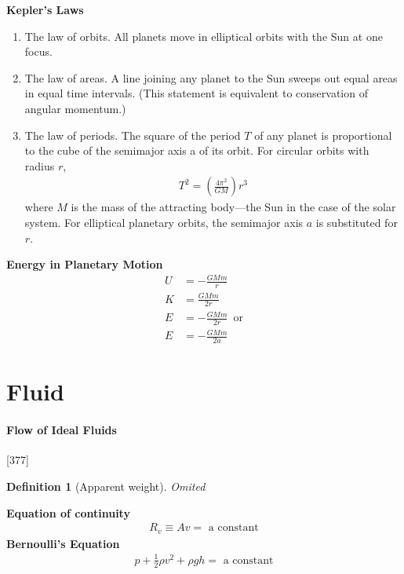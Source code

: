 \documentclass{article}
\numberwithin{equation}{subsection} %
\newtheorem{defi}{Definition}[section]
\theoremstyle{definition}
\begin{document}
\textbf{Kepler's Laws}
\begin{enumerate}
    \item The law of orbits. All planets move in elliptical orbits
        with the Sun at one focus.
    \item The law of areas. A line joining any planet to the Sun
        sweeps out equal areas in equal time intervals. (This
        statement is equivalent to conservation of angular momentum.)
    \item The law of periods. The square of the period $T$ of any
        planet is proportional to the cube of the semimajor axis a of
        its orbit. For circular orbits with radius $r$,
    \begin{align}
        T^2 = \left(\frac{4\pi^2}{GM}\right) r^3
    \end{align}
        where $M$ is the mass of the attracting body—the Sun in the
        case of the solar system. For elliptical planetary orbits, the
        semimajor axis $a$ is substituted for $r$.
\end{enumerate}

\textbf{Energy in Planetary Motion}
\begin{align}
    U &= -\frac{GMm}{r} \\
    K &= \frac{GMm}{2r} \\
    E &= -\frac{GMm}{2r} \,\text{ or} \\
    E &= -\frac{GMm}{2a} 
\end{align}

\section{Fluid}
\label{sec:Fluid}

\paragraph{Flow of Ideal Fluids}[377]
\begin{defi}[Apparent weight]
    Omited
\end{defi}

\textbf{Equation of continuity}
\begin{align}
    R_v \equiv Av = \text{ a constant}
\end{align}
\textbf{Bernoulli's Equation}
\begin{align}
    p + \frac{1}{2}\rho v^2 + \rho gh = \text{ a constant}
\end{align}
\end{document}
